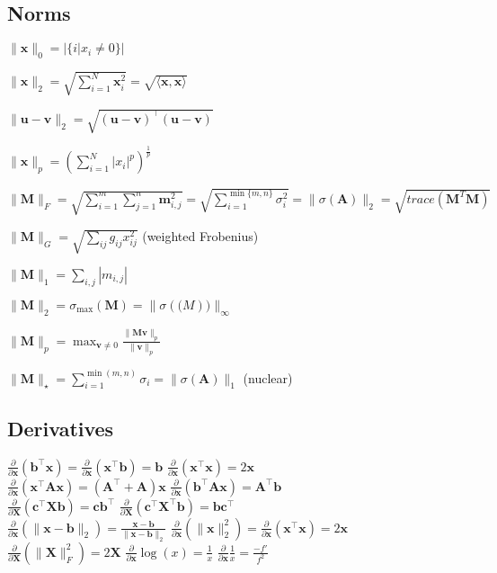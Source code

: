 \subsection*{Norms}
\begin{inparaitem}
	\item $\|\mathbf{x}\|_0 = |\{i | x_i \neq 0\}|$ 
	\item $\|\mathbf{x}\|_2 = \sqrt{\sum_{i=1}^{N} \mathbf{x}_i^2} = \sqrt{\langle \mathbf{x}, \mathbf{x} \rangle}$ 
	\item $\|\mathbf{u}-\mathbf{v}\|_2 = \sqrt{(\mathbf{u}-\mathbf{v})^\top(\mathbf{u}-\mathbf{v})}$ 
	\item $\|\mathbf{x}\|_p = \left( \sum_{i=1}^{N} |x_i|^p \right)^{\frac{1}{p}}$ 
	\item
	$\|\mathbf{M}\|_F =\allowbreak \sqrt{\sum_{i=1}^{m} \sum_{j=1}^{n}\mathbf{m}_{i,j}^2} = \sqrt{\sum_{i=1}^{\min\{m, n\}} \sigma_i^2} \allowbreak = \|\sigma(\mathbf{A})\|_2  = \sqrt{trace(\mathbf{M}^T\mathbf{M})} $
	\item $\|\mathbf{M}\|_G=\sqrt{\sum_{ij}{g_{ij}x^2_{ij}}}$ (weighted Frobenius) 
	\item
	$\|\mathbf{M}\|_1 = \sum_{i,j} | m_{i,j}|$ 
	\item $\|\mathbf{M}\|_2 = \sigma_{\text{max}}(\mathbf{M}) = \|\sigma(\mathbf(M))\|_\infty$
	\item $\|\mathbf{M}\|_p = \max_{\mathbf{v} \neq 0} \frac{\|\mathbf{M}\mathbf{v}\|_p}{\|\mathbf{v}\|_p}$ 
	\item $\|\mathbf{M}\|_\star = \sum_{i=1}^{\min(m, n)} \sigma_i = \|\sigma(\mathbf{A})\|_1$ (nuclear)
\end{inparaitem}

\subsection*{Derivatives}
$\frac{\partial}{\partial \mathbf{x}}(\mathbf{b}^\top \mathbf{x}) = \frac{\partial}{\partial \mathbf{x}}(\mathbf{x}^\top \mathbf{b}) = \mathbf{b}$ \quad
$\frac{\partial}{\partial \mathbf{x}}(\mathbf{x}^\top \mathbf{x}) = 2\mathbf{x}$\\
$\frac{\partial}{\partial \mathbf{x}}(\mathbf{x}^\top \mathbf{A}\mathbf{x}) = (\mathbf{A}^\top + \mathbf{A})\mathbf{x}$ \quad
$\frac{\partial}{\partial \mathbf{x}}(\mathbf{b}^\top \mathbf{A}\mathbf{x}) = \mathbf{A}^\top \mathbf{b}$\\
$\frac{\partial}{\partial \mathbf{X}}(\mathbf{c}^\top \mathbf{X} \mathbf{b}) = \mathbf{c}\mathbf{b}^\top$ \quad
$\frac{\partial}{\partial \mathbf{X}}(\mathbf{c}^\top \mathbf{X}^\top \mathbf{b}) = \mathbf{b}\mathbf{c}^\top$\\
$\frac{\partial}{\partial \mathbf{x}}(\| \mathbf{x}-\mathbf{b} \|_2) = \frac{\mathbf{x}-\mathbf{b}}{\|\mathbf{x}-\mathbf{b}\|_2}$ \quad
$\frac{\partial}{\partial \mathbf{x}}(\|\mathbf{x}\|^2_2) = \frac{\partial}{\partial \mathbf{x}} (\mathbf{x}^\top \mathbf{x}) = 2\mathbf{x}$\\
$\frac{\partial}{\partial \mathbf{X}}(\|\mathbf{X}\|_F^2) = 2\mathbf{X}$ \quad
$\frac{\partial}{\partial \mathbf{x}}\log(x) = \frac{1}{x}$
$\frac{\partial}{\partial \mathbf{x}}\frac{1}{x} = \frac{-f'}{f^2}$

